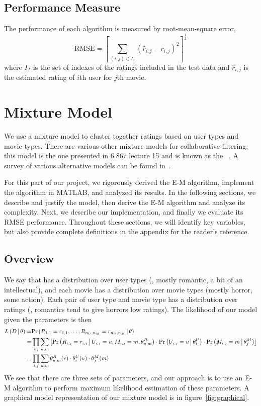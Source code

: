 \documentclass{article}
\begin{document}
\subsection{Performance Measure}
The performance of each algorithm is measured by root-mean-square
error,
\begin{equation}
  \textrm{RMSE} = \left[
    \sum_{(i,j) \in I_T} ({\hat r}_{i,j} - r_{i,j})^2
  \right]^\frac{1}{2}
\end{equation}
where $I_T$ is the set of indexes of the ratings included in the test
data and ${\hat r}_{i,j}$ is the estimated rating of $i$th user for
$j$th movie.

\section{Mixture Model}

We use a mixture model to cluster together ratings based on user types
and movie types. There are various other mixture models for
collaborative filtering; this model is the one presented in 6.867
lecture 15 and is known as the ~\cite{si03flexible}. A survey of various alternative models
can be found in~\cite{cmu-study}.

For this part of our project, we rigorously derived the E-M algorithm,
implement the algorithm in MATLAB, and analyzed its results. In the
following sections, we describe and justify the model, then derive the
E-M algorithm and analyze its complexity. Next, we describe our
implementation, and finally we evaluate its RMSE
performance. Throughout these sections, we will identify key
variables, but also provide complete definitions in the appendix for
the reader's reference.

\subsection{Overview}

We say that  has a distribution over user types (\eg,
mostly romantic, a bit of an intellectual), and each movie has a
distribution over movie types (mostly horror, some action). Each pair
of user type and movie type has a distribution over ratings (\eg,
romantics tend to give horrors low ratings). The likelihood of
our model given the parameters is then
\begin{align}
  {\ensuremath{ L \left( D \,\middle|\, \theta \right) }}
  =& {{\Pr \left(   R_{1,1} = r_{1,1}, \dots, R_{n_U,n_M} = r_{n_U,n_M}  \,\middle|\, 
    \theta   \right)}} \\
  =& \prod_{i,j} \sum_{u,m} \left[
    {{\Pr \left(   R_{i,j} = r_{i,j}  \,\middle|\,  U_{i,j} = u, M_{i,j} = m,
      \theta^R_{u,m}   \right)}} \cdot 
    {{\Pr \left(   U_{i,j} = u  \,\middle|\,  \theta^U_i   \right)}} \cdot
    {{\Pr \left(   M_{i,j} = m  \,\middle|\,  \theta^M_j   \right)}}
  \right] \\
  =& \prod_{i,j} \sum_{u,m}
  \theta^R_{u,m}(r) \cdot \theta^U_i(u) \cdot \theta^M_j(m)
\end{align}
We see that there are three sets of parameters, and our approach is to
use an E-M algorithm to perform maximum likelihood estimation of these
parameters. A graphical model representation of our mixture model is
in figure~\ref{fig:graphical}.
\end{document}
